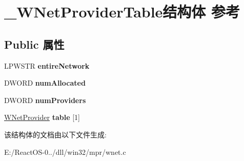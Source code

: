 \hypertarget{struct___w_net_provider_table}{}\section{\+\_\+\+W\+Net\+Provider\+Table结构体 参考}
\label{struct___w_net_provider_table}
\subsection*{Public 属性}
\begin{DoxyCompactItemize}
\item 
\mbox{\label{struct___w_net_provider_table_a2f02daf559e453440fc6557cef34f5e5}} 
L\+P\+W\+S\+TR {\bfseries entire\+Network}
\item 
\mbox{\label{struct___w_net_provider_table_a852b893b53e8bb1d8e71e4d3e9b236e3}} 
D\+W\+O\+RD {\bfseries num\+Allocated}
\item 
\mbox{\label{struct___w_net_provider_table_a857e37542861b39f3639fd053997ff3c}} 
D\+W\+O\+RD {\bfseries num\+Providers}
\item 
\mbox{\label{struct___w_net_provider_table_abe521e60e8e782c69b5ca1b2a87e5c6b}} 
\hyperlink{struct___w_net_provider}{W\+Net\+Provider} {\bfseries table} \mbox{[}1\mbox{]}
\end{DoxyCompactItemize}


该结构体的文档由以下文件生成\+:\begin{DoxyCompactItemize}
\item 
E\+:/\+React\+O\+S-\/0../dll/win32/mpr/wnet.\+c\end{DoxyCompactItemize}
